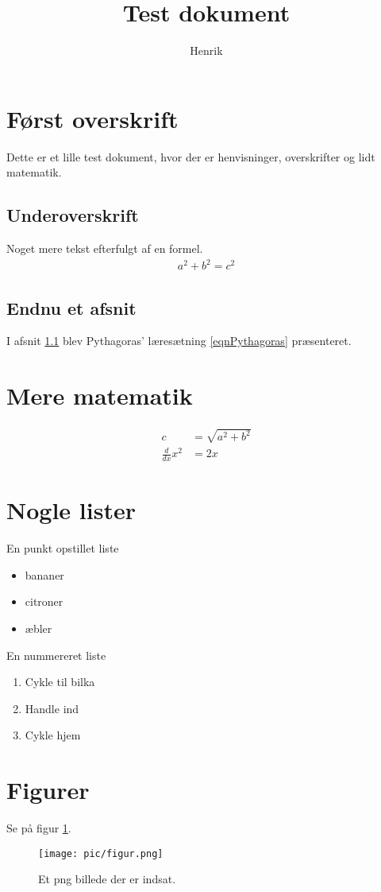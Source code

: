 \documentclass{article}
\title{Test dokument}
\author{Henrik}
\begin{document}
\maketitle

\tableofcontents

\section{Først overskrift}
\label{secFoersteOverskrift}
Dette er et lille test dokument, hvor der er henvisninger, overskrifter 
og lidt matematik.

\subsection{Underoverskrift}
\label{ssecUnderoverskrift}
Noget mere tekst efterfulgt af en formel.
\begin{align}
\label{eqnPythagoras}
a^2 + b^2 = c^2
\end{align}

\subsection{Endnu et afsnit}
I afsnit \ref{ssecUnderoverskrift} blev Pythagoras' læresætning 
\eqref{eqnPythagoras} præsenteret.

\section{Mere matematik}

\begin{align}
c
	& = \sqrt{a^2 + b^2}			\\
\frac{d}{dx} x^2
	& = 2x
\end{align}


\section{Nogle lister}

En punkt opstillet liste
\begin{itemize}
\item	bananer
\item	citroner
\item	æbler
\end{itemize}

En nummereret liste
\begin{enumerate}
\item	Cykle til bilka
\item	Handle ind
\item	Cykle hjem
\end{enumerate}

\section{Figurer}

Se på figur \ref{figTestFigure}.

\begin{figure}
\centering
\texttt{[image: pic/figur.png]}
\caption{Et png billede der er indsat.}
\label{figTestFigure}
\end{figure}
\end{document}
